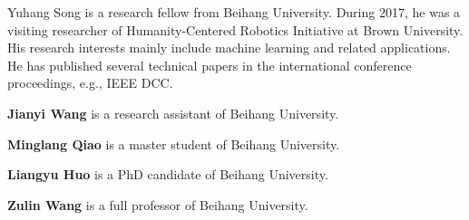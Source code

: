 \documentclass[10pt,journal,compsoc]{IEEEtran}
\begin{document}
\begin{IEEEbiography}{Yuhang Song} is a research fellow from Beihang University. During 2017, he was a visiting researcher of Humanity-Centered Robotics Initiative at Brown University. His research interests mainly include machine learning and related applications. He has published several technical papers in the international conference proceedings, e.g., IEEE DCC.
\end{IEEEbiography}

\textbf{Jianyi Wang}
is a research assistant of Beihang University.

\textbf{Minglang Qiao}
is a master student of Beihang University.


\textbf{Liangyu Huo}
is a PhD candidate of Beihang University.


\textbf{Zulin Wang}
is a full professor of Beihang University.


\vspace{-2em}







\end{document}
